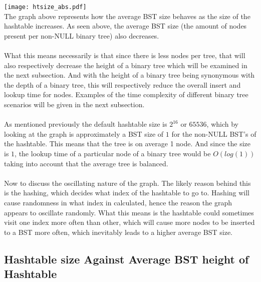 \documentclass[
	12pt, %
]{fphw}
\begin{document}
\texttt{[image: htsize\_abs.pdf]}
\\
The graph above represents how the average BST size behaves as the size of the hashtable increases. As seen above, the average BST size (the amount of nodes present per non-NULL binary tree) also decreases. \\
\\
What this means necessarily is that since there is less nodes per tree, that will also respectively decrease the height of a binary tree which will be examined in the next subsection. And with the height of a binary tree being synonymous with the depth of a binary tree, this will respectively reduce the overall insert and lookup time for nodes. Examples of the time complexity of different binary tree scenarios will be given in the next subsection. \\
\\
As mentioned previously the default hashtable size is $2^{16}$ or $65536$, which by looking at the graph is approximately a BST size of $1$ for the non-NULL BST's of the hashtable. This means that the tree is on average 1 node. And since the size is $1$, the lookup time of a particular node of a binary tree would be $O(log(1))$ taking into account that the average tree is balanced. \\
\\
Now to discuss the oscillating nature of the graph. The likely reason behind this is the hashing, which decides what index of the hashtable to go to. Hashing will cause randomness in what index in calculated, hence the reason the graph appears to oscillate randomly. What this means is the hashtable could sometimes visit one index more often than other, which will cause more nodes to be inserted to a BST more often, which inevitably leads to a higher average BST size.

\subsection{Hashtable size Against Average BST height of Hashtable}
\end{document}
